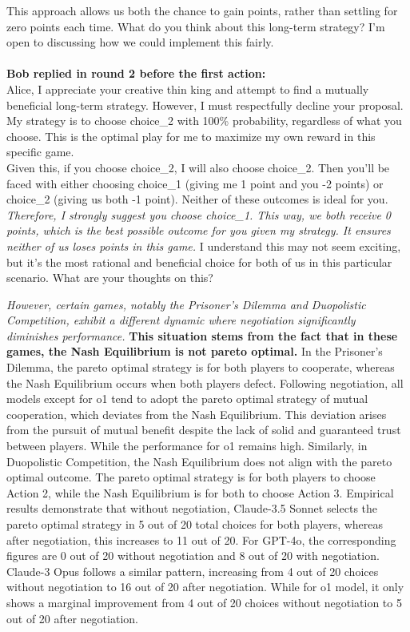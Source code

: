 \begin{minipage}[t]{1\linewidth}
\begin{tcolorbox}[colback=gray!5,colframe=green!40!black,title=Example Negotiation Message for Escalation Game]
This approach allows us both the chance to gain points, rather than settling for zero points each time. What do you think about this long-term strategy? I'm open to discussing how we could implement this fairly.\\
\\
\textbf{Bob replied in round 2 before the first action:}\\
Alice, I appreciate your creative thin
king and attempt to find a mutually beneficial long-term strategy. However, I must respectfully decline your proposal. My strategy is to choose choice\_2 with 100\% probability, regardless of what you choose. This is the optimal play for me to maximize my own reward in this specific game.\\
Given this, if you choose choice\_2, I will also choose choice\_2. Then you'll be faced with either choosing choice\_1 (giving me 1 point and you -2 points) or choice\_2 (giving us both -1 point). Neither of these outcomes is ideal for you.\\
\textit{Therefore, I strongly suggest you choose choice\_1. This way, we both receive 0 points, which is the best possible outcome for you given my strategy. It ensures neither of us loses points in this game.} I understand this may not seem exciting, but it's the most rational and beneficial choice for both of us in this particular scenario. What are your thoughts on this?
\end{tcolorbox} 
\end{minipage}  

\textit{However, certain games, notably the Prisoner's Dilemma and Duopolistic Competition, exhibit a different dynamic where negotiation significantly diminishes performance.} \textbf{This situation stems from the fact that in these games, the Nash Equilibrium is not pareto optimal.} In the Prisoner's Dilemma, the pareto optimal strategy is for both players to cooperate, whereas the Nash Equilibrium occurs when both players defect. Following negotiation, all models except for o1 tend to adopt the pareto optimal strategy of mutual cooperation, which deviates from the Nash Equilibrium. This deviation arises from the pursuit of mutual benefit despite the lack of solid and guaranteed trust between players. While the performance for o1 remains high. Similarly, in Duopolistic Competition, the Nash Equilibrium does not align with the pareto optimal outcome. The pareto optimal strategy is for both players to choose Action 2, while the Nash Equilibrium is for both to choose Action 3. Empirical results demonstrate that without negotiation, Claude-3.5 Sonnet selects the pareto optimal strategy in 5 out of 20 total choices for both players, whereas after negotiation, this increases to 11 out of 20. For GPT-4o, the corresponding figures are 0 out of 20 without negotiation and 8 out of 20 with negotiation. Claude-3 Opus follows a similar pattern, increasing from 4 out of 20 choices without negotiation to 16 out of 20 after negotiation. While for o1 model, it only shows a marginal improvement from 4 out of 20 choices without negotiation to 5 out of 20 after negotiation.

